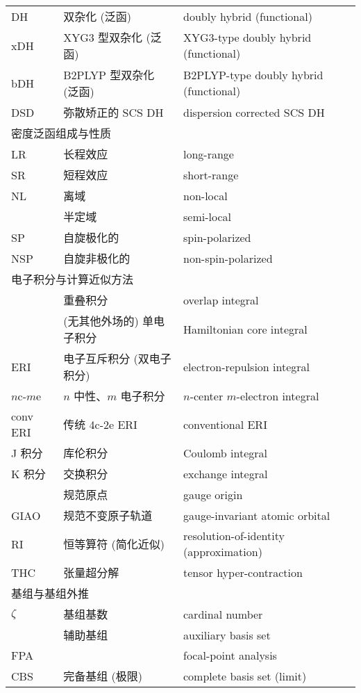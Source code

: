 \begin{longtable}{lll}
    DH & 双杂化 (泛函) & doubly hybrid (functional) \\
    xDH & XYG3 型双杂化 (泛函) & XYG3-type doubly hybrid (functional) \\
    bDH & B2PLYP 型双杂化 (泛函) & B2PLYP-type doubly hybrid (functional) \\
    DSD & 弥散矫正的 SCS DH & dispersion corrected SCS DH \\
    \midrule
    \multicolumn{3}{l}{\textsf{密度泛函组成与性质}} \\
    LR & 长程效应 & long-range \\
    SR & 短程效应 & short-range \\
    NL & 离域 & non-local \\
    & 半定域 & semi-local \\
    SP & 自旋极化的 & spin-polarized \\
    NSP & 自旋非极化的 & non-spin-polarized \\
    \midrule
    \multicolumn{3}{l}{\textsf{电子积分与计算近似方法}} \\
    & 重叠积分 & overlap integral \\
    & (无其他外场的) 单电子积分 & Hamiltonian core integral \\
    ERI & 电子互斥积分 (双电子积分) & electron-repulsion integral \\
    $n$c-$m$e & $n$ 中性、$m$ 电子积分 & $n$-center $m$-electron integral \\
    conv ERI & 传统 4c-2e ERI & conventional ERI \\
    J 积分 & 库伦积分 & Coulomb integral \\
    K 积分 & 交换积分 & exchange integral \\
    & 规范原点 & gauge origin \\
    GIAO & 规范不变原子轨道 & gauge-invariant atomic orbital \\
    RI & 恒等算符 (简化近似) & resolution-of-identity (approximation) \\
    THC & 张量超分解 & tensor hyper-contraction \\
    \midrule
    \multicolumn{3}{l}{\textsf{基组与基组外推}} \\
    $\zeta$ & 基组基数 & cardinal number \\
    & 辅助基组 & auxiliary basis set \\
    FPA & & focal-point analysis \\
    CBS & 完备基组 (极限) & complete basis set (limit) \\

\end{longtable}
